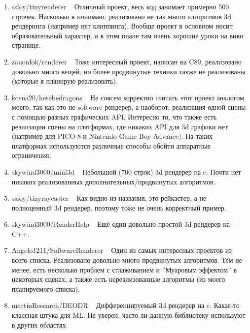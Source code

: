\documentclass[12pt]{article}
\begin{document}
\begin{enumerate}
	\item ssloy/tinyrenderer ~\cite{renderer1} Отличный проект, весь код занимает примерно 500 строчек. Насколько я понимаю, реализовано не так много алгоритмов 3d рендеринга (например нет клиппинга). Вообще проект в основном носит образовательный характер, и в этом плане там очень хорошие уроки на вики странице.
	\item zauonlok/renderer ~\cite{renderer2} Тоже интересный проект, написан на C89, реализовано довольно много вещей, но более продвинутые техники также не реализованы (которые я планирую реализовать).
	\item kosua20/herebedragons ~\cite{renderer3} Не совсем корректно считать этот проект аналогом моего, так как это не software рендерер, а наоборот, реализация одной сцены с помощью разных графических API. Интересно то, что также есть реализации сцены на платформах, где никаких API для 3d графики нет (например для PICO-8 и Nintendo Game Boy Advance). На таких платформах используются различные способы обойти аппаратные ограничения.
	\item skywind3000/mini3d ~\cite{renderer4} Небольшой (700 строк) 3d рендерер на c. Почти нет никаких реализованных дополнительных/продвинутых алгоритмов.
	\item ssloy/tinyraycaster ~\cite{renderer5} Как видно из названия, это рейкастер, а не полноценный 3d рендерер, поэтому тоже не очень корректный пример.
	\item skywind3000/RenderHelp ~\cite{renderer6} Ещё один довольно простой 3d рендерер на C++.
	\item Angelo1211/SoftwareRenderer ~\cite{renderer7} Один из самых интересных проектов из всего списка. Реализовано довольно много продвинутых алгоритмов. Тем не менее, есть несколько проблем с сглаживанием и ''Муаровым эффектом'' в некоторых сценах, а также есть нереализованные алгоритмы (из моего планируемого списка).
	\item martinResearch/DEODR ~\cite{renderer8} Дифференцируемый 3d рендерер на c. Какая-то классная штука для ML. Не уверен, часто ли данную библиотеку используют в других областях.
\end{enumerate}
\end{document}
